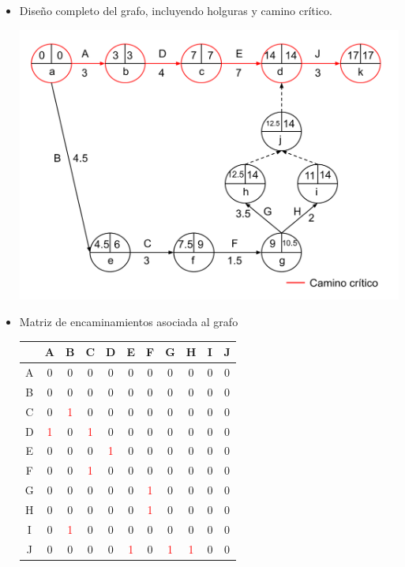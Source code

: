 \documentclass[12pt]{article}
\begin{document}
\begin{itemize}
    \item Diseño completo del grafo, incluyendo holguras y camino crítico.

    \includegraphics[scale=0.3]{../figures/pert_02.png}

    \item Matriz de encaminamientos asociada al grafo

    \begin{center}
      \begin{tabular}{c|cccccccccc}
             & A & B & C & D & E & F & G & H & I & J \\
        \hline
          A  & 0& 0& 0& 0& 0& 0& 0& 0& 0 & 0 \\
          B  & 0& 0& 0& 0& 0& 0& 0& 0& 0 & 0 \\ 
          C  & 0& \textcolor{red}{1}& 0& 0& 0& 0& 0& 0& 0 & 0 \\ 
          D  & \textcolor{red}{1}& 0& \textcolor{red}{1}& 0& 0& 0& 0& 0& 0 & 0 \\ 
          E  & 0& 0& 0& \textcolor{red}{1}& 0& 0& 0& 0& 0 & 0 \\
          F  & 0& 0& \textcolor{red}{1}& 0& 0& 0& 0& 0& 0 & 0 \\
          G  & 0& 0& 0& 0& 0& \textcolor{red}{1}& 0& 0& 0 & 0 \\
          H  & 0& 0& 0& 0& 0& \textcolor{red}{1}& 0& 0& 0 & 0 \\
          I  & 0& \textcolor{red}{1}& 0& 0& 0& 0& 0& 0& 0 & 0 \\
          J  & 0& 0& 0& 0& \textcolor{red}{1}& 0& \textcolor{red}{1}& \textcolor{red}{1}& 0 & 0 
      \end{tabular}
    \end{center}


\end{itemize}
\end{document}
